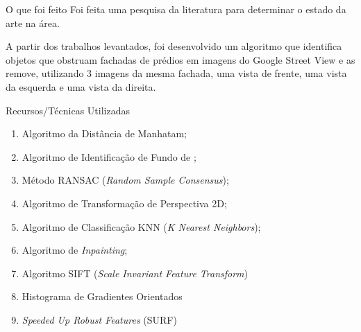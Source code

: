 \documentclass{beamer}
\begin{document}
    \begin{frame}{O que foi feito}
        Foi feita uma pesquisa da literatura para determinar o estado da arte na área.
    
        A partir dos trabalhos levantados, foi desenvolvido um algoritmo que identifica objetos que obstruam fachadas de prédios em imagens do Google Street View e as remove, utilizando 3 imagens da mesma fachada, uma vista de frente, uma vista da esquerda e uma vista da direita.
    \end{frame}
    
    \begin{frame}{Recursos/Técnicas Utilizadas}
        \begin{enumerate}[label=({\arabic*})]
            \item <1-> Algoritmo da Distância de Manhatam;
            
            \item <2-> Algoritmo de Identificação de Fundo de ;
            
            \item <3-> Método RANSAC (\textit{Random Sample Consensus});
            
            \item <4-> Algoritmo de Transformação de Perspectiva 2D;
            
            \item <5-> Algoritmo de Classificação KNN (\textit{K Nearest Neighbors});
            
            \item <6-> Algoritmo de \textit{Inpainting};
            
            
            \item <7-> Algoritmo SIFT (\textit{Scale Invariant Feature Transform})
            
            \item <8-> Histograma de Gradientes Orientados
            
            \item <9-> \textit{Speeded Up Robust Features} (SURF)
        \end{enumerate}
    \end{frame}
    
\end{document}
